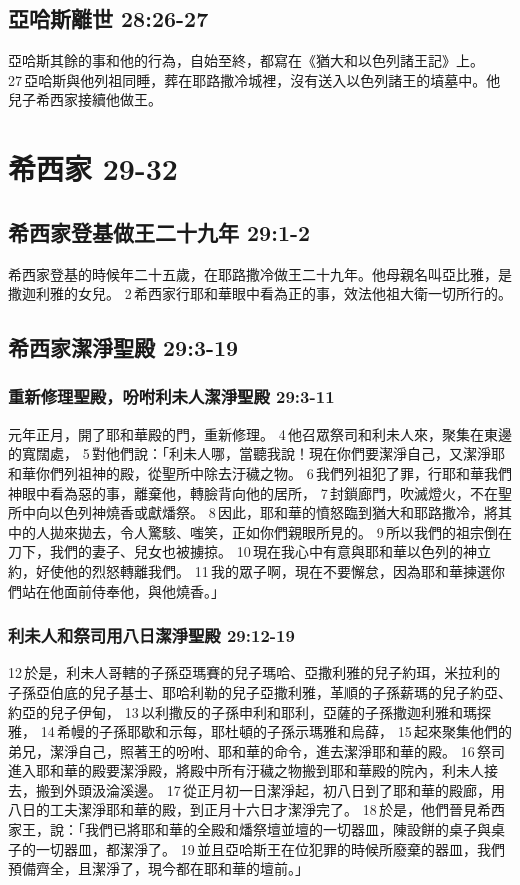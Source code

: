 \subsection{亞哈斯離世 28:26-27}
亞哈斯其餘的事和他的行為，自始至終，都寫在《猶大和以色列諸王記》上。 27 亞哈斯與他列祖同睡，葬在耶路撒冷城裡，沒有送入以色列諸王的墳墓中。他兒子希西家接續他做王。

\section{希西家 29-32 }
\subsection{希西家登基做王二十九年 29:1-2}
希西家登基的時候年二十五歲，在耶路撒冷做王二十九年。他母親名叫亞比雅，是撒迦利雅的女兒。 2 希西家行耶和華眼中看為正的事，效法他祖大衛一切所行的。


\subsection{希西家潔淨聖殿 29:3-19}
\subsubsection{重新修理聖殿，吩咐利未人潔淨聖殿 29:3-11}
元年正月，開了耶和華殿的門，重新修理。 4 他召眾祭司和利未人來，聚集在東邊的寬闊處， 5 對他們說：「利未人哪，當聽我說！現在你們要潔淨自己，又潔淨耶和華你們列祖神的殿，從聖所中除去汙穢之物。 6 我們列祖犯了罪，行耶和華我們神眼中看為惡的事，離棄他，轉臉背向他的居所， 7 封鎖廊門，吹滅燈火，不在聖所中向以色列神燒香或獻燔祭。 8 因此，耶和華的憤怒臨到猶大和耶路撒冷，將其中的人拋來拋去，令人驚駭、嗤笑，正如你們親眼所見的。 9 所以我們的祖宗倒在刀下，我們的妻子、兒女也被擄掠。 10 現在我心中有意與耶和華以色列的神立約，好使他的烈怒轉離我們。 11 我的眾子啊，現在不要懈怠，因為耶和華揀選你們站在他面前侍奉他，與他燒香。」

\subsubsection{利未人和祭司用八日潔淨聖殿 29:12-19}
12 於是，利未人哥轄的子孫亞瑪賽的兒子瑪哈、亞撒利雅的兒子約珥，米拉利的子孫亞伯底的兒子基士、耶哈利勒的兒子亞撒利雅，革順的子孫薪瑪的兒子約亞、約亞的兒子伊甸， 13 以利撒反的子孫申利和耶利，亞薩的子孫撒迦利雅和瑪探雅， 14 希幔的子孫耶歇和示每，耶杜頓的子孫示瑪雅和烏薛， 15 起來聚集他們的弟兄，潔淨自己，照著王的吩咐、耶和華的命令，進去潔淨耶和華的殿。 16 祭司進入耶和華的殿要潔淨殿，將殿中所有汙穢之物搬到耶和華殿的院內，利未人接去，搬到外頭汲淪溪邊。 17 從正月初一日潔淨起，初八日到了耶和華的殿廊，用八日的工夫潔淨耶和華的殿，到正月十六日才潔淨完了。 18 於是，他們晉見希西家王，說：「我們已將耶和華的全殿和燔祭壇並壇的一切器皿，陳設餅的桌子與桌子的一切器皿，都潔淨了。 19 並且亞哈斯王在位犯罪的時候所廢棄的器皿，我們預備齊全，且潔淨了，現今都在耶和華的壇前。」


